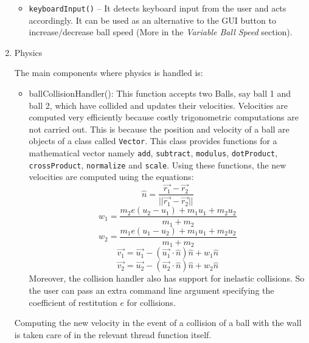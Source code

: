 \documentclass[]{article}
\newcommand{\ty}[1]{\texttt{#1}}
\begin{document}
\begin{enumerate}
\begin{flushleft}
\begin{itemize}
\item \ty{keyboardInput()} -- It detects keyboard input from the user and acts accordingly. It can be used as an alternative to the GUI button to increase/decrease ball speed (More in the \emph{Variable Ball Speed} section).
\end{itemize}
\end{flushleft}
\item Physics
\begin{flushleft}
The main components where physics is handled is:
\begin{itemize}
\item ballCollisionHandler(): This function accepts two Balls, say ball 1 and ball 2, which have collided and updates their velocities. Velocities are computed very efficiently because costly trigonometric computations are not carried out. This is because the position and velocity of a ball are objects of a class called \ty{Vector}. This class provides functions for a mathematical vector namely \ty{add}, \ty{subtract}, \ty{modulus}, \ty{dotProduct}, \ty{crossProduct}, \ty{normalize} and \ty{scale}. Using these functions, the new velocities are computed using the equations:
\begin{displaymath}
\hat{n} = \frac{\vec{r_{1}} - \vec{r_{2}}}{||\vec{r_{1}} - \vec{r_{2}}||}
\end{displaymath}
\begin{displaymath}
w_1 = \frac{m_2e(u_2 - u_1) + m_1u_1 + m_2u_2} {m_1+m_2}
\end{displaymath}
\begin{displaymath}
w_2 = \frac{m_1e(u_1 - u_2) + m_1u_1 + m_2u_2} {m_1+m_2}
\end{displaymath}
\begin{displaymath}
\vec{v_{1}} = \vec{u_{1}} - (\vec{u_{1}}\cdot\hat{n})\hat{n} + w_1\hat{n}
\end{displaymath}
\begin{displaymath}
\vec{v_{2}} = \vec{u_{2}} - (\vec{u_{2}}\cdot\hat{n})\hat{n} + w_2\hat{n}
\end{displaymath}
Moreover, the collision handler also has support for inelastic collisions. So the user can pass an extra command line argument specifying the coefficient of restitution $e$ for collisions.
\end{itemize}
Computing the new velocity in the event of a collision of a ball with the wall is taken care of in the relevant thread function itself. 
\end{flushleft}
\end{enumerate}
\end{document}
